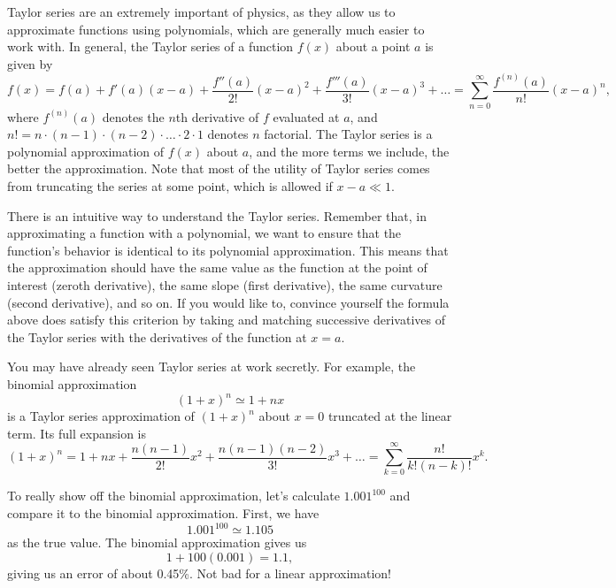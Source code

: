 \documentclass{article}
\begin{document}
Taylor series are an extremely important of physics, as they allow us to approximate functions using polynomials, which are generally much easier to work with. In general, the Taylor series of a function $f(x)$ about a point $a$ is given by
\begin{equation*}
	f(x) = f(a) + f'(a)(x-a) + \frac{f''(a)}{2!}(x-a)^2 + \frac{f'''(a)}{3!}(x-a)^3 + \ldots = \sum_{n=0}^{\infty} \frac{f^{(n)}(a)}{n!} (x-a)^n, \tag{Taylor Series}
\end{equation*}
where $f^{(n)}(a)$ denotes the $n$th derivative of $f$ evaluated at $a$, and $n! = n\cdot (n-1)\cdot(n-2)\cdot \ldots \cdot 2\cdot 1$ denotes $n$ factorial. The Taylor series is a polynomial approximation of $f(x)$ about $a$, and the more terms we include, the better the approximation. Note that most of the utility of Taylor series comes from truncating the series at some point, which is allowed if $x-a \ll 1$. 

\vspace{1em}

There is an intuitive way to understand the Taylor series. Remember that, in approximating a function with a polynomial, we want to ensure that the function's behavior is identical to its polynomial approximation. This means that the approximation should have the same value as the function at the point of interest (zeroth derivative), the same slope (first derivative), the same curvature (second derivative), and so on. If you would like to, convince yourself the formula above does satisfy this criterion by taking and matching successive derivatives of the Taylor series with the derivatives of the function at $x=a$.

\vspace{1em}

You may have already seen Taylor series at work secretly. For example, the binomial approximation 
\[
(1+x)^n \simeq 1+nx
\]
is a Taylor series approximation of $(1+x)^n$ about $x=0$ truncated at the linear term. Its full expansion is 
\[
(1+x)^n = 1 + nx + \frac{n(n-1)}{2!}x^2 + \frac{n(n-1)(n-2)}{3!}x^3 + \ldots = \sum_{k=0}^{\infty} \frac{n!}{k!(n-k)!}x^k.
\]

To really show off the binomial approximation, let's calculate $1.001^{100}$ and compare it to the binomial approximation. First, we have
\[
1.001^{100} \simeq 1.105
\]
as the true value. The binomial approximation gives us
\[
1 + 100(0.001) = 1.1,
\]
giving us an error of about 0.45\%. Not bad for a linear approximation!

\vspace{2em}
\end{document}

